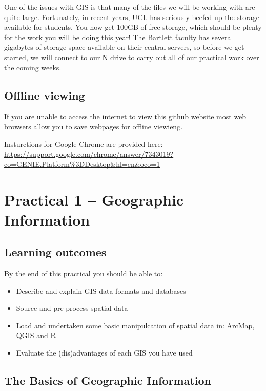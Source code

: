 \documentclass[]{book}
\providecommand{\tightlist}{%
  \setlength{\itemsep}{0pt}\setlength{\parskip}{0pt}}
\begin{document}
One of the issues with GIS is that many of the files we will be working with are quite large. Fortunately, in recent years, UCL has seriously beefed up the storage available for students. You now get 100GB of free storage, which should be plenty for the work you will be doing this year! The Bartlett faculty has several gigabytes of storage space available on their central servers, so before we get started, we will connect to our N drive to carry out all of our practical work over the coming weeks.

\hypertarget{offline-viewing}{%
\section{Offline viewing}\label{offline-viewing}}

If you are unable to access the internet to view this github website most web browsers allow you to save webpages for offline viewieng.

Insturctions for Google Chrome are provided here: \url{https://support.google.com/chrome/answer/7343019?co=GENIE.Platform\%3DDesktop\&hl=en\&oco=1}

\hypertarget{practical-1-geographic-information}{%
\chapter{Practical 1 -- Geographic Information}\label{practical-1-geographic-information}}

\hypertarget{learning-outcomes}{%
\section{Learning outcomes}\label{learning-outcomes}}

By the end of this practical you should be able to:

\begin{itemize}
\tightlist
\item
  Describe and explain GIS data formats and databases
\item
  Source and pre-process spatial data
\item
  Load and undertaken some basic manipulcation of spatial data in: ArcMap, QGIS and R
\item
  Evaluate the (dis)advantages of each GIS you have used
\end{itemize}

\hypertarget{the-basics-of-geographic-information}{%
\section{The Basics of Geographic Information}\label{the-basics-of-geographic-information}}
\end{document}
